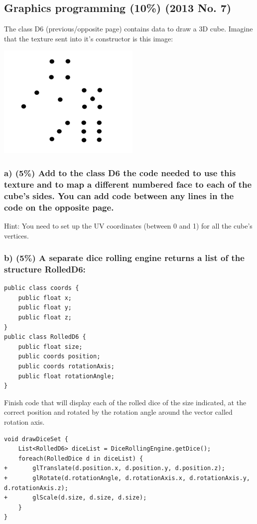 \subsection{Graphics programming (10\%) (2013 No. 7)}
The class D6 (previous/opposite page) contains data to draw a 3D cube.  Imagine that the texture sent into it's constructor is this image:

\includegraphics{sections/tasks/res/tgra-2013-07-dice-texture.png}

\subsubsection{a) (5\%) Add to the class D6 the code needed to use this texture and to map a different numbered face to each of the cube's sides. You can add code between any lines in the code on the opposite page.}
Hint: You need to set up the UV coordinates (between 0 and 1) for all the cube's vertices.

\subsubsection{b) (5\%) A separate dice rolling engine returns a list of the structure RolledD6:}

\small
\begin{verbatim}
public class coords {
    public float x;
    public float y;
    public float z;
}
public class RolledD6 {
    public float size;
    public coords position;
    public coords rotationAxis;
    public float rotationAngle;
}
\end{verbatim}

Finish code that will display each of the rolled dice of the size indicated, at the correct position and rotated by the rotation angle around the vector called rotation axis.

\begin{verbatim}
void drawDiceSet {
    List<RolledD6> diceList = DiceRollingEngine.getDice();
    foreach(RolledDice d in diceList) {
+       glTranslate(d.position.x, d.position.y, d.position.z);
+       glRotate(d.rotationAngle, d.rotationAxis.x, d.rotationAxis.y, d.rotationAxis.z);
+       glScale(d.size, d.size, d.size);
    }
}
\end{verbatim}
\normalsize
\newpage

